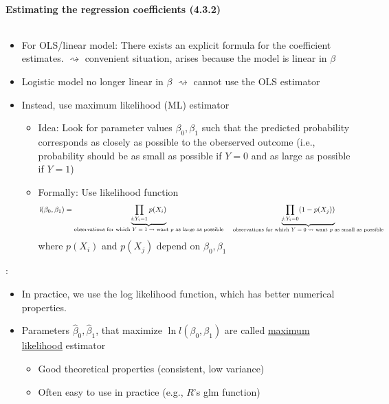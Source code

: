 \documentclass[11pt,a4paper,numbers=endperiod]{scrartcl}
\newcommand{\id}{\hspace*{4mm}}
\newcommand{\tit}[1]{\begin{large} \underline{\text{#1}}\end{large}}
\begin{document}
{\paragraph{Estimating the regression coefficients (4.3.2)}
$ $\\

\begin{itemize}
	\item For OLS/linear model: There exists an explicit formula for the coefficient estimates. $\rightsquigarrow$ convenient situation, arises because the model is linear in $\beta$
	\item Logistic model no longer linear in $\beta$ $\rightsquigarrow$ cannot use the OLS estimator
	\item  Instead, use maximum likelihood (ML) estimator \begin{itemize}
		\item Idea: Look for parameter values $\beta_0, \beta_1$ such that the predicted probability corresponds as closely as possible to the oberserved outcome (i.e., probability should be as small as possible if $Y = 0$ and as large as possible if $Y =1$)
	\item Formally: Use likelihood function \begin{align*}
		\textit{l}(\beta_0, \beta_1) = \underbrace{\prod\limits_{i: Y_i = 1} p(X_i)}_{\text{observations for which $Y = 1 \rightsquigarrow$ want $p$ as large as possible}}  \id \underbrace{\prod\limits_{j: Y_i = 0} (1 - p(X_j))}_{\text{observations for which $Y = 0\rightsquigarrow$ want $p$ as small as possible}}
	\end{align*}
	where $p(X_i)$ and $p(X_j)$ depend on $\beta_0, \beta_1$
	\end{itemize}
\end{itemize}

\tit{Note}: \begin{itemize}
	\item In practice, we use the log likelihood function, which has better numerical properties. 
	\item Parameters $\hat{\beta}_0, \hat{\beta}_1$, that maximize $\ln \textit{l}(\beta_0, \beta_1)$ are called \underline{maximum likelihood} estimator \begin{itemize}
		\item Good theoretical properties (consistent, low variance)
		\item Often easy to use in practice (e.g., $R$'s glm function)
	\end{itemize}
\end{itemize}

}
\end{document}
